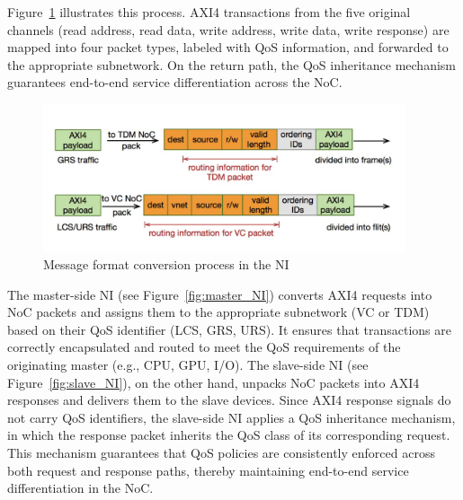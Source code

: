 Figure~\ref{fig:message_format} illustrates this process. AXI4 transactions from the five original channels (read address, read data, write address, write data, write response) are mapped into four packet types, labeled with QoS information, and forwarded to the appropriate subnetwork. On the return path, the QoS inheritance mechanism guarantees end-to-end service differentiation across the NoC.

\begin{figure}[htbp]
    \centering
    \includegraphics[width=0.95\textwidth]{img/Message format conversion.png}
    \caption{Message format conversion process in the NI}
    \label{fig:message_format}
\end{figure}


The master-side NI (see Figure~\ref{fig:master_NI}) converts AXI4 requests into NoC packets and assigns them to the appropriate subnetwork (VC or TDM) based on their QoS identifier (LCS, GRS, URS). It ensures that transactions are correctly encapsulated and routed to meet the QoS requirements of the originating master (e.g., CPU, GPU, I/O).
The slave-side NI (see Figure~\ref{fig:slave_NI}), on the other hand, unpacks NoC packets into AXI4 responses and delivers them to the slave devices. Since AXI4 response signals do not carry QoS identifiers, the slave-side NI applies a QoS inheritance mechanism, in which the response packet inherits the QoS class of its corresponding request. 
This mechanism guarantees that QoS policies are consistently enforced across both request and response paths, thereby maintaining end-to-end service differentiation in the NoC.

